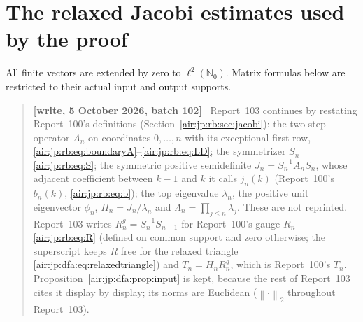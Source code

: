 \documentclass[11pt,letterpaper]{article}
\numberwithin{equation}{section}
\theoremstyle{remark}
\newenvironment{writenotejp}{\par\smallskip\begin{quote}\small\textbf{[write, 5 October 2026, batch 102]}\ }{\end{quote}\smallskip}
\newcommand{\normtwo}[1]{\left\lVert#1\right\rVert_2}
\begin{document}
\section{The relaxed Jacobi estimates used by the proof}\label{air:jp:dfa:sec:jacobi}
All finite vectors are extended by zero to $\ell^2(\mathbb N_0)$. Matrix formulas below are restricted to their actual input and output supports.
\begin{writenotejp}
Report~103 continues by restating Report~100's definitions (Section~\ref{air:jp:rb:sec:jacobi}): the two-step operator $A_n$ on coordinates $0,\ldots,n$ with its exceptional first row, \eqref{air:jp:rb:eq:boundaryA}--\eqref{air:jp:rb:eq:LD}; the symmetrizer $S_n$ \eqref{air:jp:rb:eq:S}; the symmetric positive semidefinite $J_n=S_n^{-1}A_nS_n$, whose adjacent coefficient between $k-1$ and $k$ it calls $j_n(k)$ (Report~100's $b_n(k)$, \eqref{air:jp:rb:eq:b}); the top eigenvalue $\lambda_n$, the positive unit eigenvector $\phi_n$, $H_n=J_n/\lambda_n$ and $\Lambda_n=\prod_{j\le n}\lambda_j$. These are not reprinted. Report~103 writes $R_n^g=S_n^{-1}S_{n-1}$ for Report~100's gauge $R_n$ \eqref{air:jp:rb:eq:R} (defined on common support and zero otherwise; the superscript keeps $R$ free for the relaxed triangle \eqref{air:jp:dfa:eq:relaxedtriangle}) and $T_n=H_nR_n^g$, which is Report~100's $T_n$. Proposition~\ref{air:jp:dfa:prop:input} is kept, because the rest of Report~103 cites it display by display; its norms are Euclidean ($\normtwo{\cdot}$ throughout Report~103).
\end{writenotejp}
\end{document}
